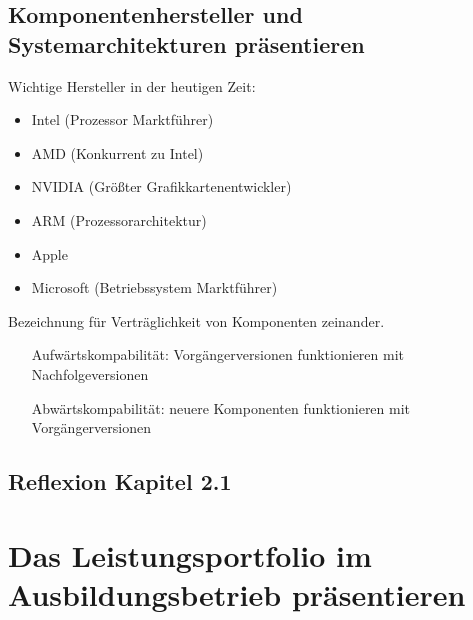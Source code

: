 \documentclass[11pt]{article}
\newlength{\subsectionindent}
\newenvironment{indentedtext}[1][\subsectionindent]
{%
  \begingroup
  \setlength{\leftskip}{#1}%
  \setlength{\parindent}{0pt}%
}
{%
  \par\endgroup
}
\begin{document}
\subsection{Komponentenhersteller und Systemarchitekturen präsentieren}
    \begin{indentedtext}
        Wichtige Hersteller in der heutigen Zeit:
    \end{indentedtext}
    \vspace{-0.5em}
    \begin{itemize}[leftmargin=2.5cm]
        \item Intel (Prozessor Marktführer)
        \item AMD (Konkurrent zu Intel)
        \item NVIDIA (Größter Grafikkartenentwickler)
        \item ARM (Prozessorarchitektur)
        \item Apple
        \item Microsoft (Betriebssystem Marktführer)
    \end{itemize}
    \vspace{0.5em}
    \begin{tcolorbox}[width=15cm, center, title=Kompatibilität, coltitle=white, colframe=white!20!blue, colback=white!80!blue]
        Bezeichnung für Verträglichkeit von Komponenten zeinander.
        \begin{itemize}[labelsep=1em, align=parleft, leftmargin=*, widest=Abwärtskompabilität, itemsep=0em]
            \item[Aufwärtskompabilität:] Vorgängerversionen funktionieren mit Nachfolgeversionen
            \item[Abwärtskompabilität: ] neuere Komponenten funktionieren mit Vorgängerversionen
        \end{itemize}
    \end{tcolorbox}
\subsection*{Reflexion Kapitel 2.1}

\newpage
\section{Das Leistungsportfolio im Ausbildungsbetrieb präsentieren}
\end{document}
